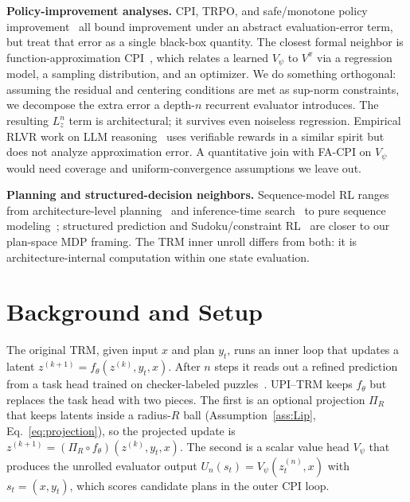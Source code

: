 \documentclass{article}
\theoremstyle{plain}
\theoremstyle{definition}
\theoremstyle{remark}
\begin{document}
\textbf{Policy-improvement analyses.}
CPI, TRPO, and safe/monotone policy improvement~\citep{KakadeLangford2002,Schulman2015TRPO,Pirotta2013SafePI,Metelli2021SafePI,Eshwar2025MonotoneCPI} all bound improvement under an abstract evaluation-error term, but treat that error as a single black-box quantity. The closest formal neighbor is function-approximation CPI~\citep{Metelli2021SafePI,Eshwar2025MonotoneCPI}, which relates a learned $V_\psi$ to $V^\pi$ via a regression model, a sampling distribution, and an optimizer. We do something orthogonal: assuming the residual and centering conditions are met as sup-norm constraints, we decompose the extra error a depth-$n$ recurrent evaluator introduces. The resulting $L_z^n$ term is architectural; it survives even noiseless regression. Empirical RLVR work on LLM reasoning~\citep{Wang2025OneShotRLVR,Su2025RewardBridge,DeepSeekR1} uses verifiable rewards in a similar spirit but does not analyze approximation error. A quantitative join with FA-CPI on $V_\psi$ would need coverage and uniform-convergence assumptions we leave out.

\textbf{Planning and structured-decision neighbors.}
Sequence-model RL ranges from architecture-level planning~\citep{Tamar2016VIN} and inference-time search~\citep{janner2021trajectory} to pure sequence modeling~\citep{chen2021decision,laskin2022context}; structured prediction and Sudoku/constraint RL~\citep{Daume2009SEARN,Ross2011DAgger,Chang2015LOLS,Mehta2021SudokuRL,Klein2022SudokuRL} are closer to our plan-space MDP framing. The TRM inner unroll differs from both: it is architecture-internal computation within one state evaluation.

\section{Background and Setup}
\label{sec:setup}


The original TRM, given input $x$ and plan $y_t$, runs an inner loop that updates a latent $z^{(k+1)} = f_\theta(z^{(k)}, y_t, x)$. After $n$ steps it reads out a refined prediction from a task head trained on checker-labeled puzzles~\citep{TRM2025}. UPI--TRM keeps $f_\theta$ but replaces the task head with two pieces. The first is an optional projection $\Pi_R$ that keeps latents inside a radius-$R$ ball (Assumption~\ref{ass:Lip}, Eq.~\ref{eq:projection}), so the projected update is
\(
z^{(k+1)} = (\Pi_R \circ f_\theta)(z^{(k)}, y_t, x).
\)
The second is a scalar value head $V_\psi$ that produces the unrolled evaluator output $U_n(s_t)=V_\psi(z_t^{(n)},x)$ with $s_t=(x,y_t)$, which scores candidate plans in the outer CPI loop.
\end{document}
